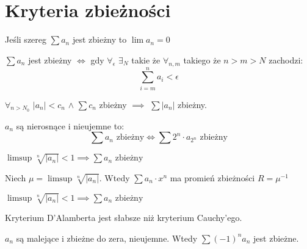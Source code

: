 \section{Kryteria zbieżności}

\begin{condition}[konieczne]
    Jeśli szereg $\sum a_n$ jest zbieżny to $\lim a_n = 0$
\end{condition}

\begin{condition}
    $\sum a_n$ jest zbieżny $\iff$ gdy $\forall_{\epsilon}$ $\exists_{N}$ takie że $\forall_{n,m}$ takiego że  $n > m > N$ zachodzi:
    \begin{equation*}
        \sum \limits_{i=m}^{n} a_i < \epsilon
    \end{equation*}
\end{condition}

\begin{condition}[porównawcze]
    $\forall_{n > N_0}$ $|a_n| < c_n$ $\land$ $\sum c_n$ zbieżny $\implies$ $\sum |a_n|$ zbieżny.
\end{condition}

\begin{condition}[kondensacyjne]
    $a_n$ są nierosnące i nieujemne to:
    \begin{equation*}
        \sum a_n \text{ zbieżny} \iff \sum 2^n \cdot a_{2^n} \text{ zbieżny}
    \end{equation*}
\end{condition}

\begin{condition}
    $\limsup \sqrt[n]{|a_n|} < 1 \implies \sum a_n \text{ zbieżny}$
\end{condition}
    
\begin{theorem}
    Niech $\mu = \limsup \sqrt[n]{|a_n|}$. Wtedy $\sum a_n \cdot x^n$ ma promień zbieżności $R = \mu^{-1}$
\end{theorem}

\begin{condition}[D'Alamberta]
    $\limsup \sqrt[n]{|a_n|} < 1 \implies \sum a_n \text{ zbieżny}$
\end{condition}

\begin{corollary}
    Kryterium D'Alamberta jest słabsze niż kryterium Cauchy'ego.
\end{corollary}

\begin{condition}[Leibniza]
    $a_n$ są malejące i zbieżne do zera, nieujemne. Wtedy $\sum (-1)^n a_n$ jest zbieżne. 
\end{condition}


